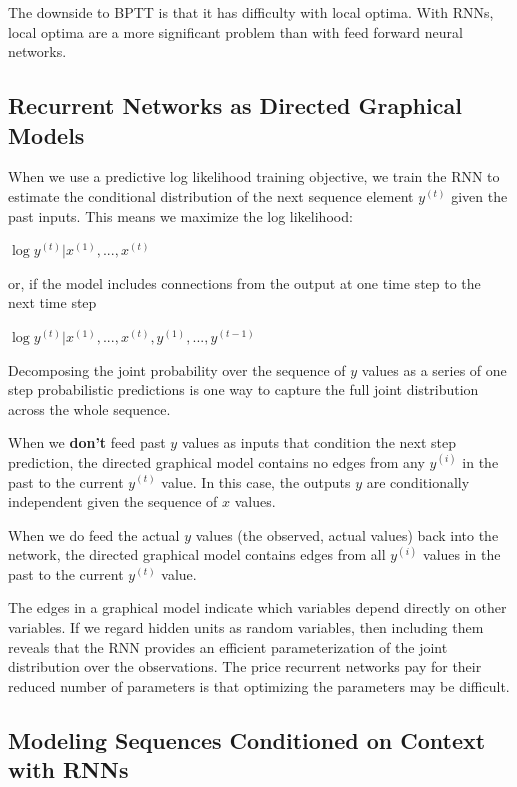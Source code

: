 \documentclass[letterpaper, 12pt]{report}
\begin{document}
The downside to BPTT is that it has difficulty with local optima. With RNNs, local optima are a more significant problem than with feed forward neural networks. 

\subsection{Recurrent Networks as Directed Graphical Models}

When we use a predictive log likelihood training objective, we train the RNN to estimate the conditional distribution of the next sequence element $y^{(t)}$ given the past inputs. This means we maximize the log likelihood:

\begin{center}
  $\log{y^{(t)} | x^{(1)}, ..., x^{(t)}}$
\end{center}

or, if the model includes connections from the output at one time step to the next time step

\begin{center}
  $\log{y^{(t)} | x^{(1)}, ..., x^{(t)}, y^{(1)}, ..., y^{(t-1)}}$  
\end{center}

Decomposing the joint probability over the sequence of $y$ values as a series of one step probabilistic predictions is one way to capture the full joint distribution across the whole sequence. 

When we \textbf{don't} feed past $y$ values as inputs that condition the next step prediction, the directed graphical model contains no edges from any $y^{(i)}$ in the past to the current $y^{(t)}$ value. In this case, the outputs $y$ are conditionally independent given the sequence of $x$ values. 

When we do feed the actual $y$ values (the observed, actual values) back into the network, the directed graphical model contains edges from all $y^{(i)}$ values in the past to the current $y^{(t)}$ value. 

The edges in a graphical model indicate which variables depend directly on other variables. If we regard hidden units as random variables, then including them reveals that the RNN provides an efficient parameterization of the joint distribution over the observations. The price recurrent networks pay for their reduced number of parameters is that optimizing the parameters may be difficult. 

\subsection{Modeling Sequences Conditioned on Context with RNNs}
\end{document}
